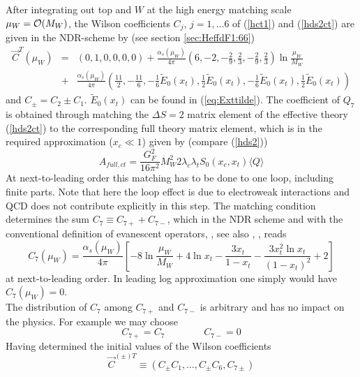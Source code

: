 After integrating out top and $W$ at the high energy matching scale
$\mu_W={\cal O}(M_W)$, the Wilson coefficients $C_j$, $j=1, \ldots 6$
of (\ref{hct1}) and (\ref{hds2ct}) are given in the NDR-scheme by
(see section \ref{sec:HeffdF1:66})
\begin{eqnarray}\label{ctmuw}
\vec C^T(\mu_W) & = & (0, 1, 0, 0, 0, 0)+ 
  \frac{\alpha_s(\mu_W)}{4\pi}
  \left(6, -2, -\frac{2}{9}, \frac{2}{3}, -\frac{2}{9}, \frac{2}{3}
  \right)\ln\frac{\mu_W}{M_W} \nonumber\\ 
  & + & \frac{\alpha_s(\mu_W)}{4\pi}
  \left(\frac{11}{2}, -\frac{11}{6}, -\frac{1}{6}\tilde E_0(x_t),
  \frac{1}{2}\tilde E_0(x_t), -\frac{1}{6}\tilde E_0(x_t),
  \frac{1}{2}\tilde E_0(x_t)\right)
\end{eqnarray}
and $C_\pm=C_2\pm C_1$. $\tilde E_0(x_t)$ can be found in
(\ref{eq:Exttilde}).
The coefficient of $Q_7$ is obtained through matching the $\Delta S=2$
matrix element of the effective theory (\ref{hds2ct}) to the
corresponding full theory matrix element, which is in the required
approximation ($x_c\ll 1$) given by (compare (\ref{hds2}))
\begin{equation}\label{afullct}
A_{full, ct}=\frac{G^2_F}{16\pi^2}M^2_W 2\lambda_c\lambda_t
S_0(x_c,x_t)\langle Q\rangle
\end{equation}
At next-to-leading order this matching has to be done to one loop,
including finite parts. Note that here the loop effect is due to
electroweak interactions and QCD does not contribute explicitly in this
step.  The matching condition determines the sum $C_7\equiv
C_{7+}+C_{7-}$, which in the NDR scheme and with the conventional
definition of evanescent operators, \cite{burasweisz:90}, see also
\cite{herrlichnierste:95}, \cite{nierste:95}, reads
\begin{equation}\label{c7muw}
C_7(\mu_W)=\frac{\alpha_s(\mu_W)}{4\pi}\left[-8\ln\frac{\mu_W}{M_W}+
4\ln x_t-\frac{3x_t}{1-x_t}-\frac{3x^2_t\ln x_t}{(1-x_t)^2}+2\right]
\end{equation}
at next-to-leading order.
In leading log approximation one simply would have $C_7(\mu_W)=0$.
\\
The distribution of $C_7$ among $C_{7+}$ and $C_{7-}$ is arbitrary
and has no impact on the physics. For example we may choose
\begin{equation}\label{c7pm}
C_{7+}=C_7\qquad\qquad  C_{7-}=0
\end{equation}
Having determined the initial values of the Wilson coefficients
\begin{equation}\label{cvpmt}
\vec C^{(\pm)T}\equiv (C_\pm C_1, \ldots, C_\pm C_6, C_{7\pm})
\end{equation}
